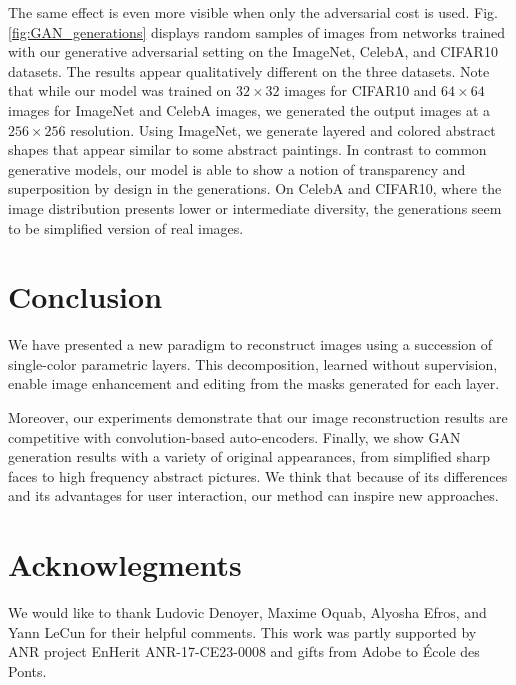 \documentclass[10pt,twocolumn,letterpaper]{article}
\begin{document}
The same effect is even more visible when only the adversarial cost is used. Fig. \ref{fig:GAN_generations} displays random samples of images from networks trained with our generative adversarial setting on the ImageNet, CelebA, and CIFAR10 datasets. The results appear qualitatively different on the three datasets. Note that while our model was trained on $32\times32$ images for CIFAR10 and $64\times 64$ images for ImageNet and CelebA images, we generated the output images at a $256\times256$ resolution. Using ImageNet, we generate layered and colored abstract shapes that appear similar to some abstract paintings. In contrast to common generative models, our model is able to show a notion of transparency and superposition by design in the generations. On CelebA and CIFAR10, where the image distribution presents lower or intermediate diversity, the generations seem to be simplified version of real images. 



\section{Conclusion}

We have presented a new paradigm to reconstruct images using a succession of single-color parametric layers. This decomposition, learned without supervision, enable image enhancement and editing from the masks generated for each layer.

Moreover, our experiments demonstrate that our image reconstruction results are competitive with convolution-based auto-encoders.
Finally, we show GAN generation results with a variety of original appearances, from simplified sharp faces to high frequency abstract pictures.
We think that because of its differences and its advantages for user interaction, our method can inspire new approaches.

\section*{Acknowlegments}

We would like to thank Ludovic Denoyer, Maxime Oquab, Alyosha Efros, and Yann LeCun for their helpful comments. This work was partly supported by ANR project EnHerit ANR-17-CE23-0008 and gifts from Adobe to \'Ecole des Ponts.


{\small


}

\clearpage

\end{document}
